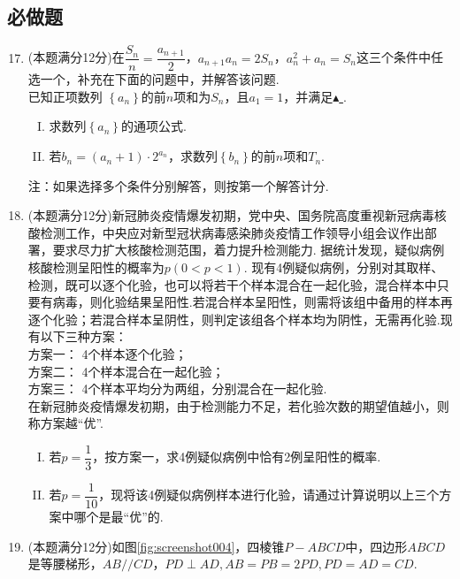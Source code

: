 \documentclass[11pt]{article}
\begin{document}
\subsection{\heiti 必做题}
\begin{enumerate}
	\setcounter{enumi}{16}
	\item (本题满分12分)在$ \dfrac{S_n}{n}=\dfrac{a_{n+1}}{2}   $，$ a_{n+1}a_n =2S_n$，$ a_n^2+a_n=S_n $这三个条件中任选一个，补充在下面的问题中，并解答该问题.
	\\已知正项数列 $ \left \{ a_n \right \}  $的前$ n $项和为$ S_n $，且$ a_1=1 $，并满足\underline{\quad \quad $ \blacktriangle $ \quad \quad  }.
	\begin{enumerate}[(I)]
		\item 求数列$ \left \{ a_n \right \}  $的通项公式.
		\item 若$ b_n=(a_n+1)\cdot2^{a_n} $，求数列$ \left \{ b_n \right \}  $的前$ n $项和$ T_n $.
	\end{enumerate}		
	\fangsong 注：如果选择多个条件分别解答，则按第一个解答计分. \songti
	\item (本题满分12分)新冠肺炎疫情爆发初期，党中央、国务院高度重视新冠病毒核酸检测工作，中央应对新型冠状病毒感染肺炎疫情工作领导小组会议作出部署，要求尽力扩大核酸检测范围，着力提升检测能力. 据统计发现，疑似病例核酸检测呈阳性的概率为$ p (0<p<1)$. 现有4例疑似病例，分别对其取样、检测，既可以逐个化验，也可以将若干个样本混合在一起化验，混合样本中只要有病毒，则化验结果呈阳性.若混合样本呈阳性，则需将该组中备用的样本再逐个化验；若混合样本呈阴性，则判定该组各个样本均为阴性，无需再化验.现有以下三种方案：
	\\方案一： 4个样本逐个化验；
	\\方案二： 4个样本混合在一起化验；
	\\方案三： 4个样本平均分为两组，分别混合在一起化验.
	\\在新冠肺炎疫情爆发初期，由于检测能力不足，若化验次数的期望值越小，则称方案越“优”.
	\begin{enumerate}[(I)]
		\item 若$ p=\dfrac{1}{3} $，按方案一，求4例疑似病例中恰有2例呈阳性的概率.
		\item 若$ p=\dfrac{1}{10} $，现将该4例疑似病例样本进行化验，请通过计算说明以上三个方案中哪个是最“优”的.
	\end{enumerate}
	\item (本题满分12分)如图\ref{fig:screenshot004}，四棱锥$ P-ABCD $中，四边形$ ABCD $是等腰梯形，$ AB//CD $，$ PD\perp AD,AB=PB=2PD,PD=AD=CD$.

\end{enumerate}
\end{document}
